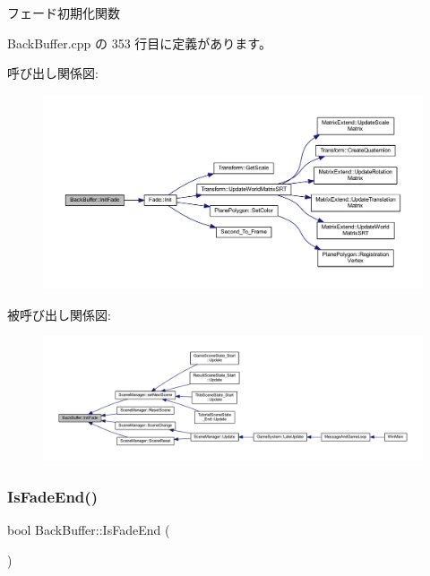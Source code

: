 フェード初期化関数 



 Back\+Buffer.\+cpp の 353 行目に定義があります。

呼び出し関係図\+:
\nopagebreak
\begin{figure}[H]
\begin{center}
\leavevmode
\includegraphics[width=350pt]{class_back_buffer_add3a034c7758dc6a72bb4582bf6ce78e_cgraph}
\end{center}
\end{figure}
被呼び出し関係図\+:
\nopagebreak
\begin{figure}[H]
\begin{center}
\leavevmode
\includegraphics[width=350pt]{class_back_buffer_add3a034c7758dc6a72bb4582bf6ce78e_icgraph}
\end{center}
\end{figure}
\mbox{\label{class_back_buffer_aab8b2f4a0fdbadccdd9413c12830a377}} 
\subsubsection{\texorpdfstring{Is\+Fade\+End()}{IsFadeEnd()}}
{\footnotesize\ttfamily bool Back\+Buffer\+::\+Is\+Fade\+End (\begin{DoxyParamCaption}{ }\end{DoxyParamCaption})\hspace{0.3cm}{\ttfamily [inline]}}



